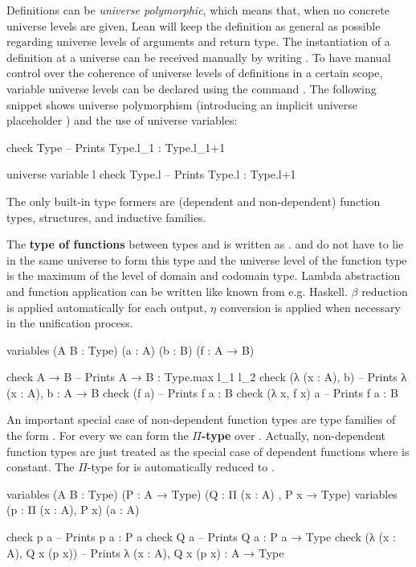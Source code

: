 Definitions can be \emph{universe polymorphic}, which means that, when no concrete
universe levels are given, Lean will keep the definition as general as possible
regarding universe levels of arguments and return type.
The instantiation of a definition  at a universe  can be received
manually by writing .
To have manual control over the coherence of universe levels of definitions in
a certain scope, variable universe levels can be declared using the command
.
The following snippet shows universe polymorphism (introducing an implicit universe
placeholder ) and the use of universe variables:
\begin{leancode}
check Type -- Prints Type.{l_1} : Type.{l_1+1}

universe variable l
check Type.{l} -- Prints Type.{l} : Type.{l+1}
\end{leancode}

The only built-in type formers are (dependent and non-dependent) function types,
structures, and inductive families.

The \textbf{type of functions} between types  and  is written
as .
 and  do not have to lie in the same universe to form this type
and the universe level of the function type is the maximum of the level of domain
and codomain type.
Lambda abstraction and function application can be written like known from e.g.
Haskell.
$\beta$ reduction is applied automatically for each output, $\eta$ conversion is
applied when necessary in the unification process.
\begin{leancode}
variables (A B : Type) (a : A) (b : B) (f : A → B)

check A → B -- Prints A → B : Type.{max l_1 l_2}
check (λ (x : A), b) -- Prints λ (x : A), b : A → B
check (f a) -- Prints f a : B
check (λ x, f x) a -- Prints f a : B
\end{leancode}

An important special case of non-dependent function types are type families
of the form . For every  we can form the
\textbf{$\Pi$-type}  over .
Actually, non-dependent function types are just treated as the special case of
dependent functions where  is constant.
The $\Pi$-type  for  is automatically reduced
to .
\begin{leancode}
variables (A B : Type) (P : A → Type) (Q : Π (x : A) , P x → Type)
variables (p : Π (x : A), P x) (a : A)

check p a -- Prints p a : P a
check Q a -- Prints Q a : P a → Type
check (λ (x : A), Q x (p x)) -- Prints λ (x : A), Q x (p x) : A → Type
\end{leancode}

